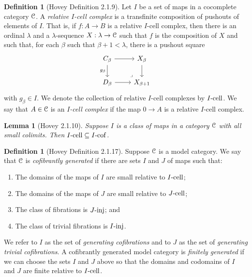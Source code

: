\documentclass{amsart}
\theoremstyle{plain}
\newtheorem{lemma}[theorem]{Lemma}
\theoremstyle{definition}
\newtheorem{definition}[theorem]{Definition}
\newcommand{\sseq}{\subseteq}
\newcommand{\0}{\mathbf{0}}
\newcommand{\cC}{\mathcal C}
\renewcommand{\(}{\left(}
\renewcommand{\)}{\right)}
\def\scr{\EuScript}
\def\cC{\scr{C}}
\newcommand{\inj}{\text-\mathrm{inj}}
\newcommand{\cell}{\text-\mathrm{cell}}
\newcommand{\cof}{\text-\mathrm{cof}}
\begin{document}
\begin{definition}[Hovey Definition 2.1.9]
  Let $I$ be a set of maps in a cocomplete category $\cC$. A \textit{relative $I$-cell complex} is a transfinite composition of pushouts of elements of $I$. That is, if $f:A\to B$ is a relative $I$-cell complex, then there is an ordinal $\lambda$ and a $\lambda$-sequence $X:\lambda\to\cC$ such that $f$ is the composition of $X$ and such that, for each $\beta$ such that $\beta+1<\lambda$, there is a pushout square
  \[\begin{tikzcd}
    {C_\beta} & {X_\beta} \\
    {D_\beta} & {X_{\beta+1}}
    \arrow[from=1-1, to=1-2]
    \arrow[from=1-2, to=2-2]
    \arrow[from=2-1, to=2-2]
    \arrow["\ulcorner"{anchor=center, pos=0.125, rotate=180}, draw=none, from=2-2, to=1-1]
    \arrow["{g_\beta}"', from=1-1, to=2-1]
  \end{tikzcd}\]
  with $g_\beta\in I$. We denote the collection of relative $I$-cell complexes by $I\cell$. We say that $A\in\cC$ is an \textit{$I$-cell complex} if the map $0\to A$ is a relative $I$-cell complex.
\end{definition}

\begin{lemma}[Hovey 2.1.10]\label{2.1.10}
  Suppose $I$ is a class of maps in a category $\cC$ with all small colimits. Then $I\cell\sseq I\cof$.
\end{lemma}

\begin{definition}[Hovey Definition 2.1.17]\label{2.1.17}
  Suppose $\cC$ is a model category. We say that $\cC$ is \textit{cofibrantly generated} if there are sets $I$ and $J$ of maps such that:\begin{enumerate}[label=\arabic*.,noitemsep,topsep=0pt]
    \item The domains of the maps of $I$ are small relative to $I\cell$;
    \item The domains of the maps of $J$ are small relative to $J\cell$;
    \item The class of fibrations is $J\inj$; and
    \item The class of trivial fibrations is $I\inj$.
  \end{enumerate}
  We refer to $I$ as the set of \textit{generating cofibrations} and to $J$ as the set of \textit{generating trivial cofibrations}. A cofibrantly generated model category is \textit{finitely generated} if we can choose the sets $I$ and $J$ above so that the domains and codomains of $I$ and $J$ are finite relative to $I\cell$.
\end{definition}
\end{document}
